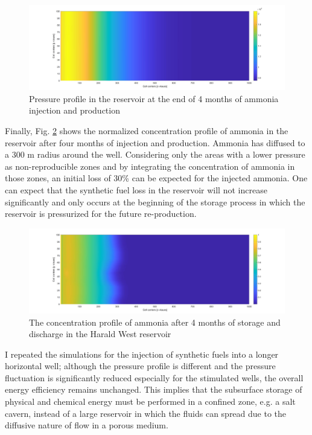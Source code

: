 \documentclass{ECOS_2021}
\begin{document}
\begin{figure}[H]
\centering
\includegraphics[width=14cm]{ammonia_pressure_harald}

\caption{\label{fig:Pressure-profile-NH3}Pressure profile in the reservoir
at the end of 4 months of ammonia injection and production}
\end{figure}

Finally, Fig. \ref{fig:concentration-profile-NH3} shows the normalized
concentration profile of ammonia in the reservoir after four months
of injection and production. Ammonia has diffused to a 300 m radius
around the well. Considering only the areas with a lower pressure
as non-reproducible zones and by integrating the concentration of
ammonia in those zones, an initial loss of 30\% can be expected for
the injected ammonia. One can expect that the synthetic fuel loss in the
reservoir will not increase significantly and only occurs at the beginning
of the storage process in which the reservoir is pressurized for the
future re-production. 

\begin{figure}[H]
\centering
\includegraphics[width=14cm]{ammonia_tracer_harald}

\caption{\label{fig:concentration-profile-NH3}The concentration profile of
ammonia after 4 months of storage and discharge in the Harald West
reservoir}
\end{figure}

I repeated the simulations for the injection of synthetic fuels into a longer horizontal well; although the pressure
profile is different and the pressure fluctuation is significantly
reduced especially for the stimulated wells, the overall energy efficiency
remains unchanged. This implies that the subsurface storage of physical
and chemical energy must be performed in a confined zone, e.g. a salt
cavern, instead of a large reservoir in which the fluids can spread
due to the diffusive nature of flow in a porous medium.
\end{document}
